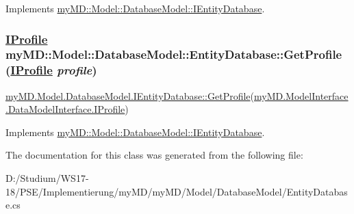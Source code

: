 Implements \hyperlink{interfacemy_m_d_1_1_model_1_1_database_model_1_1_i_entity_database_cc41e08b876f7f88b63138dc9ee26aea}{my\-MD::Model::Database\-Model::IEntity\-Database}.\hypertarget{classmy_m_d_1_1_model_1_1_database_model_1_1_entity_database_a22117377d44ffae8e1381d0814d1960}{
\subsubsection[GetProfile]{\setlength{\rightskip}{0pt plus 5cm}\hyperlink{interfacemy_m_d_1_1_model_interface_1_1_data_model_interface_1_1_i_profile}{IProfile} my\-MD::Model::Database\-Model::Entity\-Database::Get\-Profile (\hyperlink{interfacemy_m_d_1_1_model_interface_1_1_data_model_interface_1_1_i_profile}{IProfile} {\em profile})}}
\label{dd/d77/classmy_m_d_1_1_model_1_1_database_model_1_1_entity_database_a22117377d44ffae8e1381d0814d1960}


\hyperlink{interfacemy_m_d_1_1_model_1_1_database_model_1_1_i_entity_database_a22117377d44ffae8e1381d0814d1960}{my\-MD.Model.Database\-Model.IEntity\-Database::Get\-Profile}(\hyperlink{interfacemy_m_d_1_1_model_interface_1_1_data_model_interface_1_1_i_profile}{my\-MD.Model\-Interface.Data\-Model\-Interface.IProfile}) 

Implements \hyperlink{interfacemy_m_d_1_1_model_1_1_database_model_1_1_i_entity_database_a22117377d44ffae8e1381d0814d1960}{my\-MD::Model::Database\-Model::IEntity\-Database}.

The documentation for this class was generated from the following file:\begin{CompactItemize}
\item 
D:/Studium/WS17-18/PSE/Implementierung/my\-MD/my\-MD/Model/Database\-Model/Entity\-Database.cs\end{CompactItemize}
